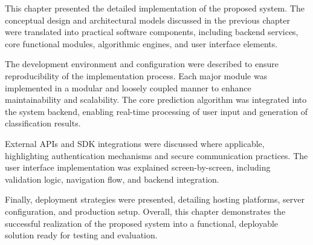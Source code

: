 This chapter presented the detailed implementation of the proposed system. 
The conceptual design and architectural models discussed in the previous chapter 
were translated into practical software components, including backend services, 
core functional modules, algorithmic engines, and user interface elements.

The development environment and configuration were described to ensure 
reproducibility of the implementation process. Each major module was implemented 
in a modular and loosely coupled manner to enhance maintainability and scalability. 
The core prediction algorithm was integrated into the system backend, enabling 
real-time processing of user input and generation of classification results.

External APIs and SDK integrations were discussed where applicable, 
highlighting authentication mechanisms and secure communication practices. 
The user interface implementation was explained screen-by-screen, including 
validation logic, navigation flow, and backend integration.

Finally, deployment strategies were presented, detailing hosting platforms, 
server configuration, and production setup. Overall, this chapter demonstrates 
the successful realization of the proposed system into a functional, 
deployable solution ready for testing and evaluation.
